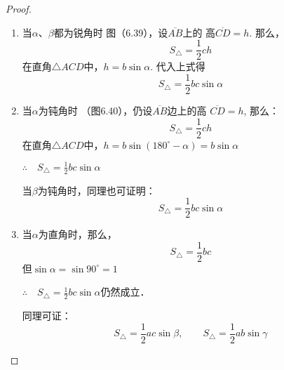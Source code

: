 \begin{proof}
\begin{enumerate}
    \item 当$\alpha$、$\beta$都为锐角时
图（6.39），设$\overline{AB}$上的
高$\overline{CD}=h$. 那么，
\[S_{\triangle}=\frac{1}{2}ch\]
在直角$\triangle ACD$中，$h=b\sin\alpha$. 
代入上式得
\[S_{\triangle}=\frac{1}{2}bc\sin\alpha\]

\begin{figure}[htp]\centering
    \begin{minipage}[t]{0.48\textwidth}
    \centering
{}
    \caption{}
    \end{minipage}
    \begin{minipage}[t]{0.48\textwidth}
    \centering
    \caption{}
    \end{minipage}
    \end{figure}

\item 当$\alpha$为钝角时
（图6.40），仍设$\overline{AB}$边上的高
$\overline{CD}=h$, 那么：
\[S_{\triangle}=\frac{1}{2}ch\]
在直角$\triangle ACD$中，$h=b\sin(180^{\circ}-\alpha)=b\sin\alpha$ 

$\therefore\quad S_{\triangle}=\frac{1}{2}bc\sin\alpha$

当$\beta$为钝角时，同理也可证明：
\[S_{\triangle}=\frac{1}{2}bc\sin\alpha\]
\item 当$\alpha$为直角时，那么，
\[S_{\triangle}=\frac{1}{2}bc \]
但$\sin\alpha=\sin 90^{\circ}=1$

$\therefore\quad S_{\triangle}=\frac{1}{2}bc\sin\alpha$仍然成立．

同理可证：
\[S_{\triangle}=\frac{1}{2} ac\sin\beta,\qquad 
S_{\triangle}=\frac{1}{2}ab\sin\gamma\]
\end{enumerate} 
\end{proof}


